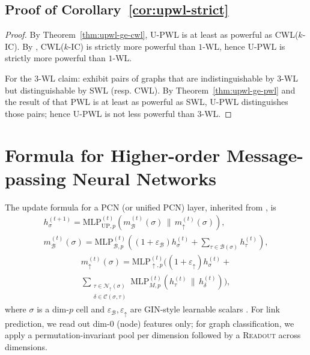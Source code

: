 \documentclass[letterpaper]{article} %
\begin{document}
\subsection{Proof of Corollary~\ref{cor:upwl-strict}} \label{app:proof-corollary}
\begin{proof}
    By Theorem~\ref{thm:upwl-ge-cwl}, U-PWL is at least as powerful as CWL(\(k\)-IC). By \cite{bodnar_weisfeiler_2022}, CWL(\(k\)-IC) is strictly more powerful than \(1\)-WL, hence U-PWL is strictly more powerful than \(1\)-WL.

    For the \(3\)-WL claim: \cite{bodnar_weisfeiler_2021, bodnar_weisfeiler_2022} exhibit pairs of graphs that are indistinguishable by \(3\)-WL but distinguishable by SWL (resp. CWL). By Theorem~\ref{thm:upwl-ge-pwl} and the result of \cite{truong_weisfeiler_2024} that PWL is at least as powerful as SWL, U-PWL distinguishes those pairs; hence U-PWL is not less powerful than \(3\)-WL.
\end{proof}

\section{Formula for Higher-order Message-passing Neural Networks} \label{app:formula-mp}
The update formula for a PCN (or unified PCN) layer, inherited from \cite{bodnar_weisfeiler_2021, bodnar_weisfeiler_2022, truong_weisfeiler_2024}, is
\begin{gather*}
    h_\sigma^{(t+1)} = \text{MLP}_{\text{UP}, p}^{(t)}\left( m_\mathcal{B}^{(t)}(\sigma) \,\|\, m_\uparrow^{(t)}(\sigma) \right), \\
    m_\mathcal{B}^{(t)}(\sigma) = \text{MLP}_{\mathcal{B}, p}^{(t)}\left( (1 + \varepsilon_\mathcal{B}) h_\sigma^{(t)} + \sum_{\tau \in \mathcal{B}(\sigma)} h_\tau^{(t)} \right),
\end{gather*}
\begin{equation*}
    \begin{aligned}
        m_\uparrow^{(t)}(\sigma) = \text{MLP}_{\uparrow, p}^{(t)}\Bigg( (1 + \varepsilon_\uparrow) h_\sigma^{(t)} + \\
        \sum_{\substack{\tau \in \mathcal{N}_\uparrow(\sigma) \\ \delta \in \mathcal{C}(\sigma, \tau)}} \text{MLP}_{M, p}^{(t)}\left( h_\tau^{(t)} \,\|\, h_\delta^{(t)} \right) \Bigg),
    \end{aligned}
\end{equation*}
where \(\sigma\) is a dim-\(p\) cell and \(\varepsilon_\mathcal{B}, \varepsilon_\uparrow\) are GIN-style learnable scalars \cite{xu_how_2019}. For link prediction, we read out dim-\(0\) (node) features only; for graph classification, we apply a permutation-invariant pool per dimension followed by a \textsc{Readout} across dimensions.
\end{document}
